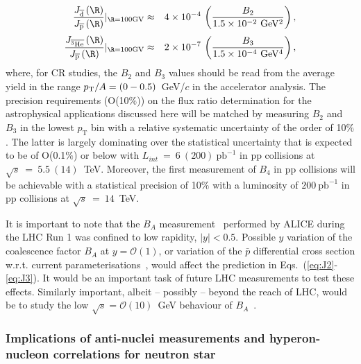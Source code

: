 %
\begin{eqnarray}\label{eq:J2}\frac{J_{\overline{\rm d}}\left(\R\right)}{J_{\overline{\rm p}}\left(\R\right)}\huge|_{\R=100{\rm GV}}&\approx&4\times10^{-4}\,\left(\frac{B_2}{1.5\times10^{-2}~\rm GeV^2}\right),\\%
%
\label{eq:J3}\frac{J_{\overline{^3\rm He}}\left(\R\right)}{J_{\overline{\rm p}}\left(\R\right)}\huge|_{\R=100{\rm GV}}&\approx&2\times10^{-7}\,\left(\frac{B_3}{1.5\times10^{-4}~\rm GeV^4}\right),\end{eqnarray}
%
where, for CR studies, the $B_2$ and $B_3$ values should be read from the average yield in the range $p\sb{\scriptstyle\mathrm{T}}/A=(0-0.5)$~GeV/$c$ in the accelerator analysis. 
%
The precision requirements (O(10$\%$)) on the flux ratio determination for the astrophysical applications discussed here will be matched by measuring $B_{2}$ and $B_{3}$ in the lowest $p_{\mathrm{T}}$ bin with a relative systematic uncertainty of the order of 10$\%$. The latter is largely dominating over the statistical uncertainty that is expected to be of O(0.1$\%$) or below with $L_{int}~=~6~(200)~\mathrm{pb}^{-1}$ in pp collisions at $\sqrt{s}~=~5.5~(14)$~TeV. 
Moreover, the first measurement of $B_{4}$ in pp collisions will be achievable with a statistical precision of 10$\%$ with a luminosity of $200~\mathrm{pb}^{-1}$ in pp collisions at $\sqrt{s}~=~14$~TeV.

It is important to note that the $B_A$ measurement~\cite{Acharya:2017fvb} performed by ALICE during the LHC Run 1 was confined to low rapidity, $|y|<0.5$. Possible $y$ variation of the coalescence factor $B_A$ at $y=\mathcal{O}(1)$, or variation of the $\bar p$ differential cross section w.r.t. current parameterisations~\cite{Donato:2017ywo}, would affect the prediction in Eqs.~(\ref{eq:J2}-\ref{eq:J3}). It would be an important task of future LHC measurements to test these effects. Similarly important, albeit -- possibly -- beyond the reach of LHC, would be to study the low $\sqrt{s}=\mathcal{O}(10)$~GeV behaviour of $B_A$~\cite{Blum:2017qnn}.


\subsubsection{Implications of anti-nuclei measurements and hyperon-nucleon correlations for neutron star }

